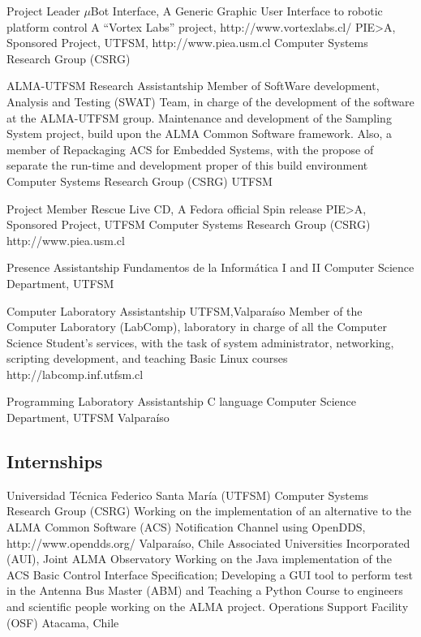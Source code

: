\documentclass[11pt,a4paper]{moderncv}
\begin{document}
	{Project Leader}
	{$\mu$Bot Interface, A Generic Graphic User Interface to robotic platform control}
	{A ``Vortex Labs'' project, http://www.vortexlabs.cl/}
	{PIE>A, Sponsored Project, UTFSM, http://www.piea.usm.cl}
	{Computer Systems Research Group (CSRG)}

	{ALMA-UTFSM Research Assistantship}
	{Member of SoftWare development, Analysis and Testing (SWAT) Team, in charge of the development of the software at the ALMA-UTFSM group.
	Maintenance and development of the Sampling System project, build upon the ALMA Common Software framework.
	Also, a member of Repackaging ACS for Embedded Systems, with the propose of separate the run-time and development
	proper of this build environment}
	{Computer Systems Research Group (CSRG)}
	{UTFSM}
	{}

	{Project Member}
	{Rescue Live CD, A Fedora official Spin release}
	{PIE>A, Sponsored Project, UTFSM}
	{Computer Systems Research Group (CSRG)}
	{http://www.piea.usm.cl}

	{Presence Assistantship}
	{Fundamentos de la Informática  I and II}
	{Computer Science Department, UTFSM}
	{}{}

	{Computer Laboratory Assistantship}
	{UTFSM,Valparaíso}
	{Member of the Computer Laboratory (LabComp), laboratory in charge of all the Computer Science Student's services, with the task of system administrator, networking, scripting development, and teaching Basic Linux courses}
	{http://labcomp.inf.utfsm.cl}{}

	{Programming Laboratory Assistantship}
	{C language}
	{Computer Science Department, UTFSM}
	{Valparaíso}
	{}

\subsection{Internships}

	{Universidad Técnica Federico Santa María (UTFSM)}
	{Computer Systems Research Group (CSRG)}
	{Working on the implementation of an alternative to the ALMA Common Software (ACS) Notification Channel using OpenDDS, http://www.opendds.org/}
	{Valparaíso, Chile}
	{Associated Universities Incorporated (AUI), Joint ALMA Observatory}
	{Working on the Java implementation of the ACS Basic Control Interface Specification; Developing a GUI tool to perform test in the Antenna Bus Master (ABM) and Teaching a Python Course to engineers and scientific people working on the ALMA project.}
	{Operations Support Facility (OSF)}
	{Atacama, Chile}
\end{document}
